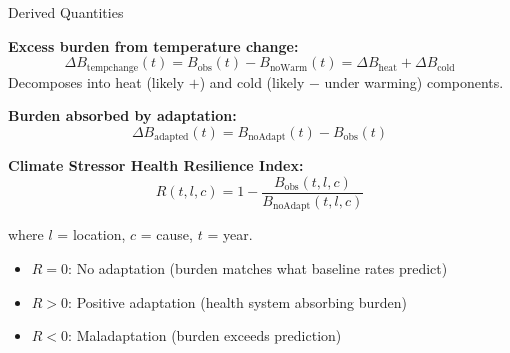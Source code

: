 \documentclass[aspectratio=169,10pt]{beamer}
\begin{document}
\begin{frame}{Derived Quantities}

  \textbf{Excess burden from temperature change:}
  \begin{equation*}
    \Delta B_{\text{tempchange}}(t) = B_{\text{obs}}(t) - B_{\text{noWarm}}(t) = \Delta B_{\text{heat}} + \Delta B_{\text{cold}}
  \end{equation*}
  {\small Decomposes into heat (likely $+$) and cold (likely $-$ under warming) components.}

  \vspace{0.3em}
  \textbf{Burden absorbed by adaptation:}
  \begin{equation*}
    \Delta B_{\text{adapted}}(t) = B_{\text{noAdapt}}(t) - B_{\text{obs}}(t)
  \end{equation*}

  \vspace{0.5em}
  \textbf{Climate Stressor Health Resilience Index:}
  \begin{equation*}
    \boxed{\;R(t,l,c) = 1 - \frac{B_{\text{obs}}(t,l,c)}{B_{\text{noAdapt}}(t,l,c)}\;}
  \end{equation*}

  {\small where $l$ = location, $c$ = cause, $t$ = year.}
  \begin{itemize}
    \item $R = 0$: No adaptation (burden matches what baseline rates predict)
    \item $R > 0$: Positive adaptation (health system absorbing burden)
    \item $R < 0$: Maladaptation (burden exceeds prediction)
  \end{itemize}
\end{frame}
\end{document}
